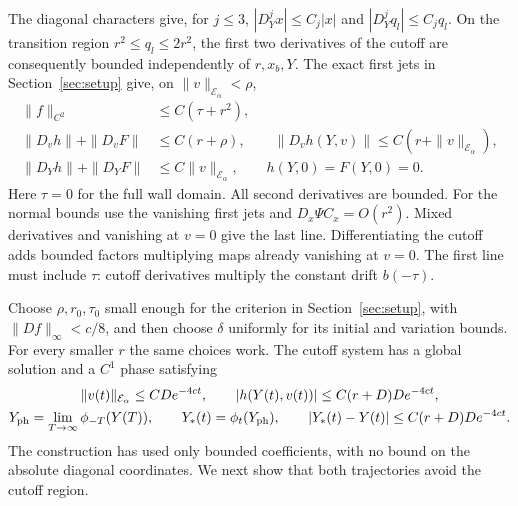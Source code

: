 \documentclass[11pt]{amsart}
\theoremstyle{definition}
\theoremstyle{remark}
\begin{document}
The diagonal characters give, for $j\le3$,
$|D_Y^jx|\le C_j|x|$ and $|D_Y^jq_l|\le C_jq_l$.
On the transition region $r^2\le q_l\le2r^2$, the first
two derivatives of the cutoff are consequently bounded
independently of $r,x_b,Y$. The exact first jets in
Section~\ref{sec:setup} give, on $\|v\|_{\mathcal E_\alpha}<\rho$,
\begin{equation}\label{eq:cutoff-estimates}
 \begin{aligned}
 \|f\|_{C^2}&\le C(\tau+r^2),\\
 \|D_vh\|+\|D_vF\|&\le C(r+\rho),\qquad
 \|D_vh(Y,v)\|\le C(r+\|v\|_{\mathcal E_\alpha}),\\
 \|D_Yh\|+\|D_YF\|&\le C\|v\|_{\mathcal E_\alpha},\qquad
 h(Y,0)=F(Y,0)=0.
 \end{aligned}
\end{equation}
Here $\tau=0$ for the full wall domain. All second derivatives
are bounded. For the normal bounds use the vanishing first
jets and $D_x\Psi C_x=O(r^2)$. Mixed derivatives and vanishing
at $v=0$ give the last line. Differentiating the cutoff
adds bounded factors multiplying maps already vanishing at
$v=0$. The first line must include $\tau$: cutoff derivatives
multiply the constant drift $b(-\tau)$.

Choose $\rho,r_0,\tau_0$ small enough for the criterion in
Section~\ref{sec:setup}, with $\|Df\|_\infty<c/8$, and then
choose $\delta$ uniformly for its initial and variation bounds.
For every smaller $r$ the same choices work. The cutoff system
has a global solution and a $C^1$ phase satisfying
\begin{equation}\label{eq:coordinate-phase}
 \begin{gathered}
 \|v(t)\|_{\mathcal E_\alpha}\le CD e^{-4ct},\qquad
 |h(Y(t),v(t))|\le C(r+D)D e^{-4ct},\\
 Y_{\rm ph}=\lim_{T\to\infty}\phi_{-T}(Y(T)),\qquad
 Y_*(t)=\phi_t(Y_{\rm ph}),\qquad
 |Y_*(t)-Y(t)|\le C(r+D)D e^{-4ct}.
 \end{gathered}
\end{equation}
The construction has used only bounded coefficients, with no
bound on the absolute diagonal coordinates. We next show
that both trajectories avoid the cutoff region.
\end{document}
